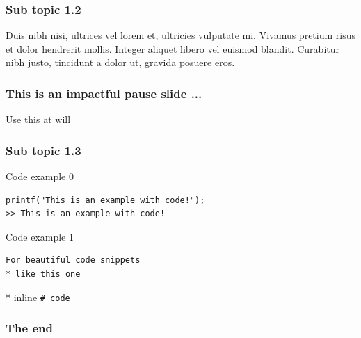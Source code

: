 \documentclass[aspectratio=169]{beamer}
\begin{document}
\begin{frame}
\frametitle{Sub topic 1.2}

Duis nibh nisi, ultrices vel lorem et, ultricies vulputate mi. 
Vivamus pretium risus et dolor hendrerit mollis. 
Integer aliquet libero vel euismod blandit. 
Curabitur nibh justo, tincidunt a dolor ut, gravida posuere eros. 

\end{frame}

\begin{frame}
\frametitle{This is an impactful pause slide ...}

Use this at will
\end{frame}

\begin{frame}[fragile]
\frametitle{Sub topic 1.3}

Code example 0

\begin{lstlisting}
printf("This is an example with code!");
>> This is an example with code!
\end{lstlisting}

Code example 1
\begin{verbatim}
For beautiful code snippets
* like this one
\end{verbatim}

* inline \tt{\# code}
\end{frame}

\begin{frame}
\frametitle{The end}
\end{frame}

\frame[plain]{\titlepage}
\end{document}
